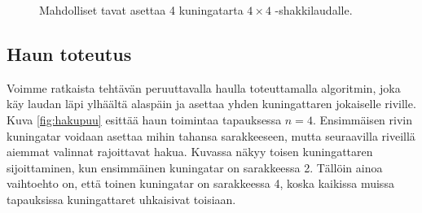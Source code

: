 \begin{figure}
\center
{}
\caption{Mahdolliset tavat asettaa 4 kuningatarta $4 \times 4$ -shakkilaudalle.}
\label{fig:kuning}
\end{figure}

\subsection{Haun toteutus}

Voimme ratkaista tehtävän peruuttavalla haulla toteuttamalla algoritmin,
joka käy laudan läpi ylhäältä alaspäin ja asettaa yhden kuningattaren
jokaiselle riville.
Kuva \ref{fig:hakupuu} esittää haun toimintaa tapauksessa $n=4$.
Ensimmäisen rivin kuningatar voidaan asettaa mihin tahansa sarakkeeseen,
mutta seuraavilla riveillä aiemmat valinnat rajoittavat hakua.
Kuvassa näkyy toisen kuningattaren sijoittaminen,
kun ensimmäinen kuningatar on sarakkeessa 2.
Tällöin ainoa vaihtoehto on, että toinen kuningatar on sarakkeessa 4,
koska kaikissa muissa tapauksissa kuningattaret uhkaisivat toisiaan.


